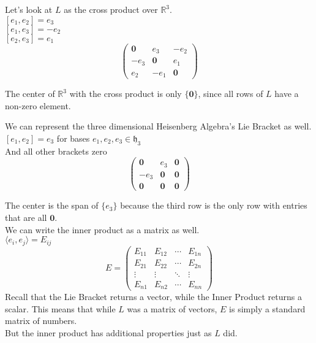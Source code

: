 \documentclass[11 pt]{article}
\newcommand{\br}[2]{\left[#1,#2\right]}
\newcommand{\inp}[2]{\langle #1, #2 \rangle}
\newcommand{\h}{\lal{h}}
\newcommand{\lal}[1]{\mathfrak{#1}}
\newcommand{\zvec}{\mathbf{0}}
\newcommand{\RR}{\mathbb{R}}
\begin{document}
    \pagebreak
    \begin{example}
    Let's look at $L$ as the cross product over $\RR^3$.
        \\$\br{e_1}{e_2}=e_3$
        \\$\br{e_1}{e_3}=-e_2$
        \\$\br{e_2}{e_3}=e_1$
        $$
        \begin{pmatrix}
              \zvec & e_3   & -e_2
            \\-e_3  & \zvec & e_1
            \\e_2   & -e_1  & \zvec
        \end{pmatrix}
    $$
    \end{example}
    The center of $\RR^3$ with the cross product is only $\{\zvec\}$, since all
    rows of $L$ have a non-zero element.
    \begin{example}
    We can represent the three dimensional Heisenberg Algebra's Lie Bracket as
    well.
        \\$\br{e_1}{e_2}=e_3$ for bases $e_1, e_2, e_3 \in \h_3$
        \\And all other brackets zero
    $$
    \begin{pmatrix}
          \zvec & e_3   & \zvec
        \\-e_3  & \zvec & \zvec
        \\\zvec & \zvec & \zvec
    \end{pmatrix}
    $$
    \end{example}
    The center is the span of $\{e_3\}$ because the third row is the only row
    with entries that are all $\zvec$.
    \\We can write the inner product as a matrix as well.
    \\$\inp{e_i}{e_j} = E_{ij}$
    $$
        E = \begin{pmatrix}
                E_{11} & E_{12} & \cdots & E_{1n} \\
                E_{21} & E_{22} & \cdots & E_{2n} \\
                \vdots & \vdots & \ddots & \vdots \\
                E_{n1} & E_{n2} & \cdots & E_{nn}
            \end{pmatrix}
    $$
    Recall that the Lie Bracket returns a vector, while the Inner Product
    returns a scalar. This means that while $L$ was a matrix of vectors,
    $E$ is simply a standard matrix of numbers.
    \\But the inner product has additional properties just as $L$ did.
\end{document}
